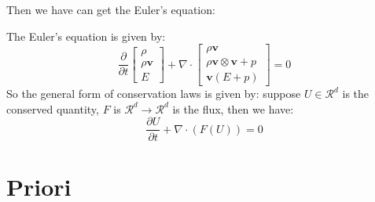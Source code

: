Then we have can get the Euler's equation:
\begin{theorem}
    The Euler's equation is given by:
    \begin{equation}
        \frac{\partial}{\partial t}\begin{bmatrix}
        \rho\\ \rho \mathbf{v}\\E
    \end{bmatrix}
    + \nabla\cdot \begin{bmatrix}
        \rho \mathbf{v}\\ \rho \mathbf{v}\otimes \mathbf{v} + p\\ \mathbf{v}(E + p)
    \end{bmatrix} = 0
\end{equation}
So the general form of conservation laws is given by: suppose $U\in \mathcal{R}^d$ is the conserved quantity, $F$ is $\mathcal{R}^d\to \mathcal{R}^d$ is the flux, 
then we have:
\begin{equation}
    \frac{\partial U}{\partial t} + \nabla\cdot \left(F(U)\right) = 0
\end{equation}

\section{Priori}

\end{theorem}
